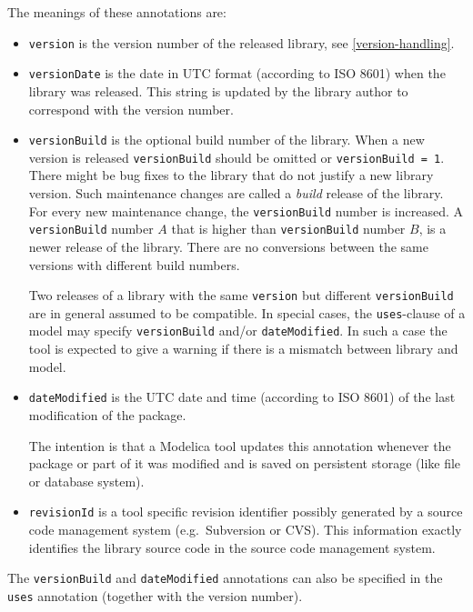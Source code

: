 The meanings of these annotations are:
\begin{itemize}
\item
  \lstinline!version! is the version number of the released library,
  see \cref{version-handling}.
\item
  \lstinline!versionDate! is the date in UTC format (according to ISO
  8601) when the library was released. This string is updated by the
  library author to correspond with the version number.
\item
  \lstinline!versionBuild! is the optional build number of the library.
  When a new version is released \lstinline!versionBuild! should be omitted or
  \lstinline!versionBuild = 1!. There might be bug fixes to the library that do
  not justify a new library version. Such maintenance changes are called
  a \emph{build} release of the library. For every new maintenance change,
  the \lstinline!versionBuild! number is increased. A \lstinline!versionBuild! number $A$
  that is higher than \lstinline!versionBuild! number $B$, is a newer release of the
  library. There are no conversions between the same versions with
  different build numbers.

  Two releases of a library with the same \lstinline!version! but different \lstinline!versionBuild! are in general assumed to be compatible.
  In special cases, the \lstinline!uses!-clause of a model may specify \lstinline!versionBuild! and/or \lstinline!dateModified!.
  In such a case the tool is expected to give a warning if there is a mismatch between library and model.
\item
  \lstinline!dateModified! is the UTC date and time (according to ISO
  8601) of the last modification of the package.

  \begin{nonnormative}
  The intention is that a Modelica tool updates this annotation whenever the package or part of it was modified and is saved on
  persistent storage (like file or database system).
  \end{nonnormative}
\item
  \lstinline!revisionId! is a tool specific revision identifier
  possibly generated by a source code management system (e.g.\ Subversion
  or CVS). This information exactly identifies the library
  source code in the source code management system.
\end{itemize}

The \lstinline!versionBuild! and \lstinline!dateModified! annotations can also be specified in
the \lstinline!uses! annotation (together with the version number).

